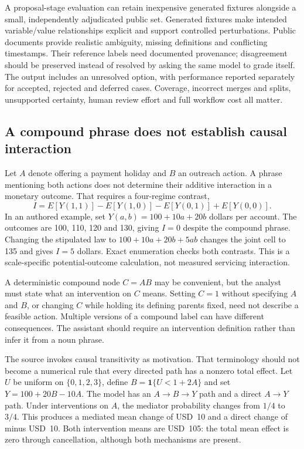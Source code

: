 A proposal-stage evaluation can retain inexpensive generated fixtures alongside a small, independently adjudicated public set. Generated fixtures make intended variable/value relationships explicit and support controlled perturbations. Public documents provide realistic ambiguity, missing definitions and conflicting timestamps. Their reference labels need documented provenance; disagreement should be preserved instead of resolved by asking the same model to grade itself. The output includes an unresolved option, with performance reported separately for accepted, rejected and deferred cases. Coverage, incorrect merges and splits, unsupported certainty, human review effort and full workflow cost all matter.

\subsection{A compound phrase does not establish causal interaction}

Let $A$ denote offering a payment holiday and $B$ an outreach action. A phrase mentioning both actions does not determine their additive interaction in a monetary outcome. That requires a four-regime contrast,
\begin{equation}
 I=E[Y(1,1)]-E[Y(1,0)]-E[Y(0,1)]+E[Y(0,0)].
 \label{eq:exec28-cm-interaction}
\end{equation}
In an authored example, set $Y(a,b)=100+10a+20b$ dollars per account. The outcomes are 100, 110, 120 and 130, giving $I=0$ despite the compound phrase. Changing the stipulated law to $100+10a+20b+5ab$ changes the joint cell to 135 and gives $I=5$ dollars. Exact enumeration checks both contrasts. This is a scale-specific potential-outcome calculation, not measured servicing interaction.~\citep{exec28_cm_reference}

A deterministic compound node $C=AB$ may be convenient, but the analyst must state what an intervention on $C$ means. Setting $C=1$ without specifying $A$ and $B$, or changing $C$ while holding its defining parents fixed, need not describe a feasible action. Multiple versions of a compound label can have different consequences. The assistant should require an intervention definition rather than infer it from a noun phrase.

The source invokes causal transitivity as motivation. That terminology should not become a numerical rule that every directed path has a nonzero total effect. Let $U$ be uniform on $\{0,1,2,3\}$, define $B=\mathbf 1\{U<1+2A\}$ and set $Y=100+20B-10A$. The model has an $A\to B\to Y$ path and a direct $A\to Y$ path. Under interventions on $A$, the mediator probability changes from $1/4$ to $3/4$. This produces a mediated mean change of USD~10 and a direct change of minus USD~10. Both intervention means are USD~105: the total mean effect is zero through cancellation, although both mechanisms are present.~\citep{exec28_cm_reference}


